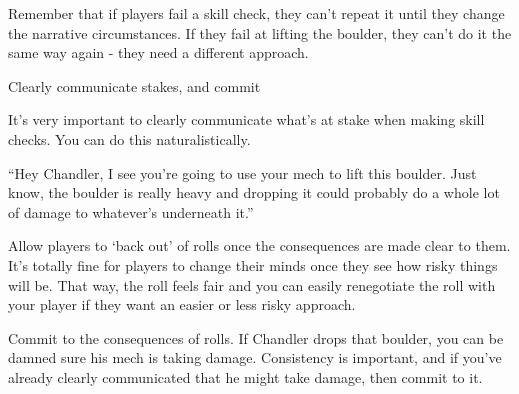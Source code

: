 Remember that if players fail a skill check, they can’t repeat it until they change the
narrative circumstances. If they fail at lifting the boulder, they can’t do it the same way again -
they need a different approach.


                              Clearly communicate stakes, and commit


It’s very important to clearly communicate what’s at stake when making skill checks. You can
do this naturalistically.

	        ``Hey Chandler, I see you’re going to use your mech to lift this boulder. Just know, the
boulder is really heavy and dropping it could probably do a whole lot of damage to whatever’s
underneath it.''





Allow players to `back out' of rolls once the consequences are made clear to them. It’s totally
fine for players to change their minds once they see how risky things will be. That way, the roll
feels fair and you can easily renegotiate the roll with your player if they want an easier or less
risky approach.


Commit to the consequences of rolls. If Chandler drops that boulder, you can be damned sure
his mech is taking damage. Consistency is important, and if you’ve already clearly
communicated that he might take damage, then commit to it.

